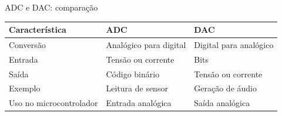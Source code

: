 \begin{frame}{ADC e DAC: comparação}
    \begin{table}
        \centering
        \begin{tabularx}{\textwidth}{@{}>{\raggedright\arraybackslash}X>{\raggedright\arraybackslash}X>{\raggedright\arraybackslash}X@{}}
            \toprule
            Característica & ADC & DAC \\
            \midrule
            Conversão & Analógico para digital & Digital para analógico \\
            Entrada & Tensão ou corrente & Bits \\
            Saída & Código binário & Tensão ou corrente \\
            Exemplo & Leitura de sensor & Geração de áudio \\
            Uso no microcontrolador & Entrada analógica & Saída analógica \\
            \bottomrule
        \end{tabularx}
    \end{table}
\end{frame}
